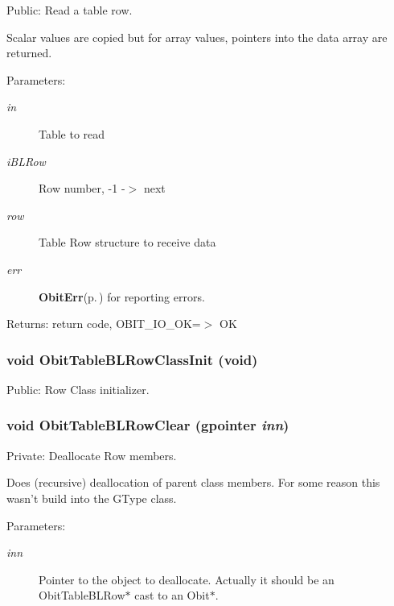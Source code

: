 Public: Read a table row. 

Scalar values are copied but for array values, pointers into the data array are returned. \begin{Desc}
\item[Parameters:]
\begin{description}
\item[{\em in}]Table to read \item[{\em i\-BLRow}]Row number, -1 -$>$ next \item[{\em row}]Table Row structure to receive data \item[{\em err}]{\bf Obit\-Err}{\rm (p.\,\pageref{structObitErr})} for reporting errors. \end{description}
\end{Desc}
\begin{Desc}
\item[Returns:]return code, OBIT\_\-IO\_\-OK=$>$ OK \end{Desc}
\subsubsection{\setlength{\rightskip}{0pt plus 5cm}void Obit\-Table\-BLRow\-Class\-Init (void)}\label{ObitTableBL_8c_a26}


Public: Row Class initializer. 

\subsubsection{\setlength{\rightskip}{0pt plus 5cm}void Obit\-Table\-BLRow\-Clear (gpointer {\em inn})}\label{ObitTableBL_8c_a7}


Private: Deallocate Row members. 

Does (recursive) deallocation of parent class members. For some reason this wasn't build into the GType class. \begin{Desc}
\item[Parameters:]
\begin{description}
\item[{\em inn}]Pointer to the object to deallocate. Actually it should be an Obit\-Table\-BLRow$\ast$ cast to an Obit$\ast$. \end{description}
\end{Desc}
